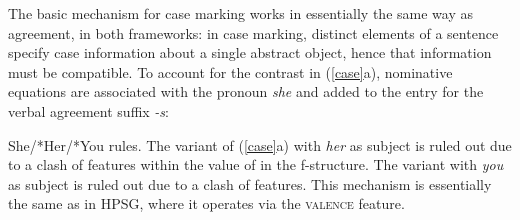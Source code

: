 The basic mechanism for case marking works in essentially the same way as agreement, in both frameworks: in case marking, distinct elements of a sentence specify case information about a single abstract object, hence that information must be compatible.   To account for the contrast in (\ref{case}a), nominative  equations are associated with the pronoun \textit{she} and added to the entry for the verbal agreement suffix \textit{-s}:

\eal 
 \label{case}
\ex She/*Her/*You rules.
 \zl
The variant of (\ref{case}a) with \textit{her} as subject is ruled out due to a clash of  features within the value of \subj{} in the f-structure.  The variant with \textit{you} as subject is ruled out due to a clash of  features.  This mechanism is essentially the same as in HPSG, where it operates via the \textsc{valence} feature.  

